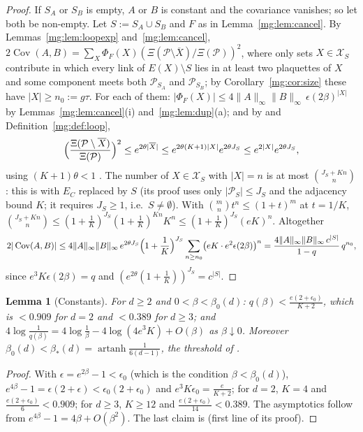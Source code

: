 \documentclass[11pt,a4paper]{article}
\newtheorem{lemma}[theorem]{Lemma}
\theoremstyle{definition}
\theoremstyle{remark}
\DeclareMathOperator{\Cov}{Cov}
\DeclareMathOperator{\artanh}{artanh}
\newcommand{\cP}{\mathcal{P}}
\newcommand{\cX}{\mathcal{X}}
\newcommand{\norm}[1]{\lVert #1\rVert}
\newcommand{\IIref}[3]{\cite[#1~`#2' (\texttt{#3})]{II}}
\newcommand{\IIIref}[3]{\cite[#1~`#2' (\texttt{#3})]{III}}
\newcommand{\IIIlab}[2]{\cite[#1 \texttt{#2}]{III}}
\begin{document}
\begin{proof}
If $S_A$ or $S_B$ is empty, $A$ or $B$ is constant and the covariance vanishes; so let both be non-empty. Let $S:=S_A\cup S_B$ and
$F$ as in Lemma~\ref{mg:lem:cancel}. By Lemmas~\ref{mg:lem:loopexp} and~\ref{mg:lem:cancel},
$2\Cov(A,B)=\sum_X\Phi_F(X)(\Xi(\cP\setminus\overline X)/\Xi(\cP))^2$, where only sets $X\in\cX_S$ contribute in which every link of
$E(X)\setminus S$ lies in at least two plaquettes of $X$ and some component meets both $\cP_{S_A}$ and $\cP_{S_B}$; by
Corollary~\ref{mg:cor:size} these have $|X|\ge n_0:=g\tau$. For each of them: $|\Phi_F(X)|\le4\norm A_\infty\norm B_\infty\,\epsilon(2\beta)^{|X|}$
by Lemmas~\ref{mg:lem:cancel}(i) and~\ref{mg:lem:dup}(a); and by \IIIref{Proposition}{Removing plaquettes}{al:prop:remove} and
Definition~\ref{mg:def:loop},
\[
\Bigl(\frac{\Xi(\cP\setminus\overline X)}{\Xi(\cP)}\Bigr)^2\le e^{2\theta|\overline X|}\le e^{2\theta(K+1)|X|}e^{2\theta J_S}\le e^{2|X|}e^{2\theta J_S},
\]
using $(K+1)\theta<1$ \IIIlab{Lemma}{al:lem:constants}. The number of $X\in\cX_S$ with $|X|=n$ is at most $\binom{J_S+Kn}{n}$: this is
\IIIref{Corollary}{Counting loop polymers}{al:cor:countloop} with $E_C$ replaced by $S$ (its proof uses only $|\cP_S|\le J_S$ and the
adjacency bound $K$; it requires $J_S\ge1$, i.e.\ $S\neq\emptyset$). With $\binom mnt^n\le(1+t)^m$ at $t=1/K$, $\binom{J_S+Kn}n\le(1+\frac1K)^{J_S}(1+\frac1K)^{Kn}K^n\le(1+\frac1K)^{J_S}(eK)^n$.
Altogether
\[
2|\Cov(A,B)|\le4\norm A_\infty\norm B_\infty\,e^{2\theta J_S}\Bigl(1+\frac1K\Bigr)^{J_S}\sum_{n\ge n_0}\bigl(eK\cdot e^2\epsilon(2\beta)\bigr)^n
=\frac{4\norm A_\infty\norm B_\infty\,c^{|S|}}{1-q}\,q^{n_0},
\]
since $e^3K\epsilon(2\beta)=q$ and $(e^{2\theta}(1+\frac1K))^{J_S}=c^{|S|}$.
\end{proof}

\begin{lemma}[Constants]\label{mg:lem:q}
For $d\ge2$ and $0<\beta<\beta_0(d)$: $q(\beta)<\frac{e(2+\epsilon_0)}{K+2}$, which is $<0.909$ for $d=2$ and $<0.389$ for $d\ge3$; and $4\log\frac1{q(\beta)}=4\log\frac1\beta-4\log(4e^3K)+O(\beta)$
as $\beta\downarrow0$. Moreover $\beta_0(d)<\beta_*(d)=\artanh\frac1{6(d-1)}$, the threshold of \cite{II}.
\end{lemma}

\begin{proof}
With $\epsilon=e^{2\beta}-1<\epsilon_0$ (which is the condition $\beta<\beta_0(d)$), $e^{4\beta}-1=\epsilon(2+\epsilon)<\epsilon_0(2+\epsilon_0)$ and
$e^3K\epsilon_0=\frac e{K+2}$; for $d=2$, $K=4$ and $\frac{e(2+\epsilon_0)}6<0.909$; for $d\ge3$, $K\ge12$ and $\frac{e(2+\epsilon_0)}{14}<0.389$. The asymptotics follow from
$e^{4\beta}-1=4\beta+O(\beta^2)$. The last claim is \IIref{Corollary}{Area law in infinite volume}{iv:cor:arealaw} (first line of its proof).
\end{proof}
\end{document}
